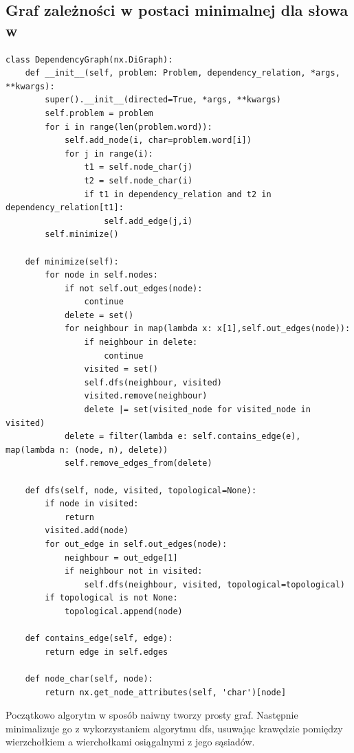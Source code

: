 \documentclass{article}
\begin{document}
        \subsection{Graf zależności w postaci minimalnej dla słowa w}
            \begin{lstlisting}
class DependencyGraph(nx.DiGraph):
    def __init__(self, problem: Problem, dependency_relation, *args, **kwargs):
        super().__init__(directed=True, *args, **kwargs)
        self.problem = problem
        for i in range(len(problem.word)):
            self.add_node(i, char=problem.word[i])
            for j in range(i):
                t1 = self.node_char(j)
                t2 = self.node_char(i)
                if t1 in dependency_relation and t2 in dependency_relation[t1]:
                    self.add_edge(j,i)
        self.minimize()

    def minimize(self):
        for node in self.nodes:
            if not self.out_edges(node):
                continue
            delete = set()
            for neighbour in map(lambda x: x[1],self.out_edges(node)):
                if neighbour in delete:
                    continue
                visited = set()
                self.dfs(neighbour, visited)
                visited.remove(neighbour)
                delete |= set(visited_node for visited_node in visited)
            delete = filter(lambda e: self.contains_edge(e), map(lambda n: (node, n), delete))
            self.remove_edges_from(delete)

    def dfs(self, node, visited, topological=None):
        if node in visited:
            return
        visited.add(node)
        for out_edge in self.out_edges(node):
            neighbour = out_edge[1]
            if neighbour not in visited:
                self.dfs(neighbour, visited, topological=topological)
        if topological is not None:
            topological.append(node)

    def contains_edge(self, edge):
        return edge in self.edges

    def node_char(self, node):
        return nx.get_node_attributes(self, 'char')[node]
            \end{lstlisting}
            Początkowo algorytm w sposób naiwny tworzy prosty graf. Następnie minimalizuje go z wykorzystaniem algorytmu dfs, usuwając krawędzie pomiędzy wierzchołkiem a wierchołkami osiągalnymi z jego sąsiadów. 
            
\end{document}
